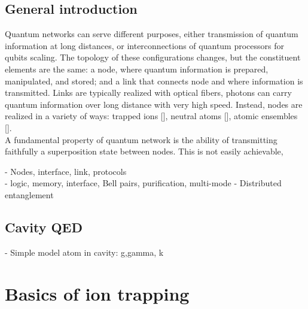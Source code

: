\subsection{General introduction}
Quantum networks can serve different purposes, either transmission of quantum information at long distances, or interconnections of quantum processors for qubits scaling. The topology of these configurations changes, but the constituent elements are the same: a node, where quantum information is prepared, manipulated, and stored; and a link that connects node and where information is transmitted. Links are typically realized with optical fibers, photons can carry quantum information over long distance with very high speed. Instead, nodes are realized in a variety of ways: trapped ions [], neutral atoms [], atomic ensembles [].\\
A fundamental property of quantum network is the ability of transmitting faithfully a superposition state between nodes. This is not easily achievable,






- Nodes, interface, link, protocols\\
- logic, memory, interface, Bell pairs, purification, multi-mode
- Distributed entanglement
\subsection{Cavity QED}
- Simple model atom in cavity: g,gamma, k
\section{Basics of ion trapping}
